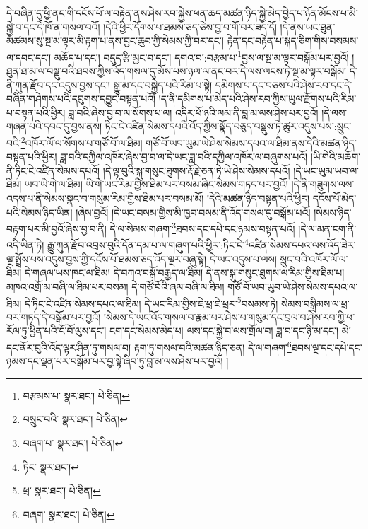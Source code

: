 དེ་བཞིན་དུ་ཕྱི་ནང་གི་དངོས་པོ་ལ་བརྟེན་ནས་ཤེས་རབ་སྐྱེས་ཕན་ཆད་མཚན་ཉིད་སྐྱེ་མེད་བྱེད་པ་ཉོན་མོངས་པ་མི་སྐྱེ་བ་དང་དེ་ཁོ་ན་གསལ་བའོ། །དེའི་ཕྱིར་དོགས་པ་ཐམས་ཅད་ཅེས་བྱ་བ་གོ་བར་ཟད་དོ། །དེ་ནས་ཡང་ཐུན་མཚམས་སུ་སྔ་མ་ལྟར་མི་རྟག་པ་ནས་བྱང་ཆུབ་ཀྱི་སེམས་ཀྱི་བར་དང་། རྟེན་དང་བརྟེན་པ་སྐད་ཅིག་གིས་བསམས་ལ་དབང་དང་། མཆོད་པ་དང་། བདུད་རྩི་མྱང་བ་དང་། དགའ་བ་:བརྩམ་པ་\footnote{བརྩམས་པ་  སྣར་ཐང་།  པེ་ཅིན། }བྱས་ལ་སྔ་མ་ལྟར་བསྒོམ་པར་བྱའོ། །ཐུན་ཐ་མ་ལ་བསྡུ་བའི་ཐབས་ཀྱིས་འོད་གསལ་དུ་མོས་པས་ཉལ་ལ་ནང་བར་དེ་ལས་ལངས་ཏེ་སྔ་མ་ལྟར་བསྒོམ། དེ་ནི་ཀུན་རྫོབ་དང་འདུས་བྱས་དང་། སྒྱུ་མ་དང་བསྐྱེད་པའི་རིམ་པ་སྟེ། དམིགས་པ་དང་བཅས་པའི་ཤེས་རབ་དང་དེ་བཞིན་གཤེགས་པའི་དབུགས་དབྱུང་བསྟན་པའོ། །ད་ནི་དམིགས་པ་མེད་པའི་ཤེས་རབ་ཀྱིས་ཡུལ་རྫོགས་པའི་རིམ་པ་བསྟན་པའི་ཕྱིར། ཟླ་བའི་ཞེས་བྱ་བ་ལ་སོགས་པ་ལ། འདིར་ཕོ་ཉའི་ལམ་ནི་བླ་མ་ལས་ཤེས་པར་བྱའོ། །དེ་ལས་གཞན་པའི་དབང་དུ་བྱས་ནས། ཏིང་ངེ་འཛིན་སེམས་དཔའི་འོད་ཀྱིས་སྣོད་བཅུད་བསྡུས་ཏེ་ཚུར་འདུས་པས་:སྲུང་བའི་\footnote{བསྲུང་བའི་  སྣར་ཐང་།  པེ་ཅིན། }འཁོར་ལོ་ལ་སོགས་པ་གཙོ་བོ་ལ་ཐིམ། གཙོ་བོ་ཡབ་ཡུམ་ཡེ་ཤེས་སེམས་དཔའ་ལ་ཐིམ་ནས་དེའི་མཚན་ཉིད་བསྟན་པའི་ཕྱིར། ཟླ་བའི་དཀྱིལ་འཁོར་ཞེས་བྱ་བ་ལ་དེ་ཡང་ཟླ་བའི་དཀྱིལ་འཁོར་ལ་བཞུགས་པའོ། །ཡི་གེའི་མཆོག་ནི་ཏིང་ངེ་འཛིན་སེམས་དཔའོ། །དེ་ལྟ་བུའི་སྐུ་གསུང་ཐུགས་རྡོ་རྗེ་ཅན་ཏེ་ཡེ་ཤེས་སེམས་དཔའོ། །དེ་ཡང་ཡུམ་ཡབ་ལ་ཐིམ། ཡབ་ཡི་གེ་ལ་ཐིམ། ཡི་གེ་ཡང་རིམ་གྱིས་ཐིམ་པར་བསམ་ཞིང་སེམས་གཏད་པར་བྱའོ། །དེ་ནི་གཟུགས་ལས་འདས་པ་ནི་སེམས་སྣང་བ་གསུམ་རིམ་གྱིས་ཐིམ་པར་བསམ་མོ། །དེའི་མཚན་ཉིད་བསྟན་པའི་ཕྱིར། དངོས་པོ་མེད་པའི་སེམས་ཉིད་ཡིན། །ཞེས་བྱའོ། །དེ་ཡང་བསམ་གྱིས་མི་ཁྱབ་བསམ་ནི་འོད་གསལ་དུ་བསྒོམ་པའོ། །སེམས་ཉིད་བརྟག་པར་མི་བྱའོ་ཞེས་བྱ་བ་ནི། དེ་ལ་སེམས་གཞག་\footnote{བཞག་པ་  སྣར་ཐང་།  པེ་ཅིན། }ཐབས་དང་དཔེ་དང་ཉམས་བསྟན་པའོ། །དེ་ལ་མན་ངག་ནི་འདི་ཡིན་ཏེ། རྒྱུ་ཀུན་རྫོབ་འབྲས་བུའི་དོན་དམ་པ་ལ་གཞུག་པའི་ཕྱིར་:ཏིང་ངེ་\footnote{ཏིང་  སྣར་ཐང་། }འཛིན་སེམས་དཔའ་ལས་འོད་ཟེར་ལྔ་སྤྲོས་པས་འདུས་བྱས་ཀྱི་དངོས་པོ་ཐམས་ཅད་འོད་ལྔར་བཞུ་སྟེ། དེ་ཡང་འདུས་པ་ལས། སྲུང་བའི་འཁོར་ལོ་ལ་ཐིམ། དེ་གཞལ་ཡས་ཁང་ལ་ཐིམ། དེ་བཀའ་བསྒོ་བརྒྱད་ལ་ཐིམ། དེ་ནས་སྐུ་གསུང་ཐུགས་ལ་རིམ་གྱིས་ཐིམ་པ། མཁའ་འགྲོ་མ་བཞི་ལ་ཐིམ་པར་བསམ། དེ་གཙོ་བོའི་ཞལ་བཞི་ལ་ཐིམ། གཙོ་བོ་ཡབ་ཡུབ་ཡེ་ཤེས་སེམས་དཔའ་ལ་ཐིམ། དེ་ཏིང་ངེ་འཛིན་སེམས་དཔའ་ལ་ཐིམ། དེ་ཡང་རིམ་གྱིས་ཇེ་ཕྲ་ཇེ་ཕྲར་\footnote{ཕྲ་  སྣར་ཐང་།  པེ་ཅིན། }བསམས་ཏེ། སེམས་བསྒྲིམས་ལ་ཕྲ་བར་གཏད་དེ་བསྒོམ་པར་བྱའོ། །སེམས་དེ་ཡང་འོད་གསལ་བ་རྣམ་པར་ཤེས་པ་གསུམ་དང་བྲལ་བ་ཤེས་རབ་ཀྱི་ཕ་རོལ་ཏུ་ཕྱིན་པའི་ངོ་བོ་ལུས་དང་། ངག་དང་སེམས་མེད་པ། ལས་དང་སྐྱེ་བ་ལས་གྲོལ་བ། ཟླ་བ་དང་ཉི་མ་དང་། མེ་དང་ནོར་བུའི་འོད་ལྟར་ཤིན་ཏུ་གསལ་བ། རྟག་ཏུ་གསལ་བའི་མཚན་ཉིད་ཅན། དེ་ལ་གཞག་\footnote{བཞག་  སྣར་ཐང་།  པེ་ཅིན། }ཐབས་ལྔ་དང་དཔེ་དང་ཉམས་དང་ལྡན་པར་བསྒོམ་པར་བྱ་སྟེ་ཞིབ་ཏུ་བླ་མ་ལས་ཤེས་པར་བྱའོ། །
